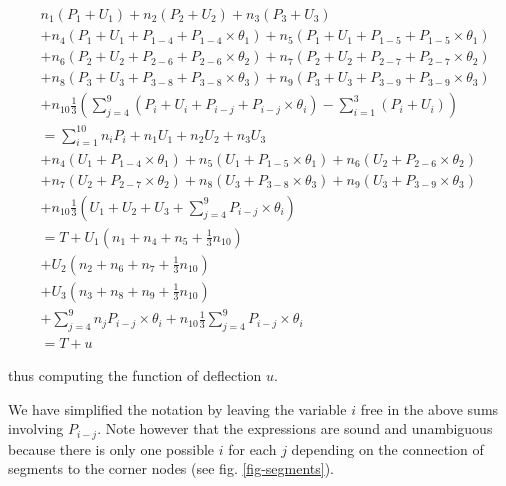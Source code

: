 \documentclass{egpubl}
\begin{document}
\begin{equation}
    \begin{split}
        & n_1 (P_1 + U_1)
        + n_2 (P_2 + U_2)
        + n_3 (P_3 + U_3) \\
        & + n_4 (P_1 + U_1 + P_{1-4} + P_{1-4} \times \theta_1)
        + n_5 (P_1 + U_1 + P_{1-5} + P_{1-5} \times \theta_1) \\
        & + n_6 (P_2 + U_2 + P_{2-6} + P_{2-6} \times \theta_2)
        + n_7(P_2 + U_2 + P_{2-7} + P_{2-7} \times \theta_2) \\
        & + n_8 (P_3 + U_3 + P_{3-8} + P_{3-8} \times \theta_3)
        + n_9 (P_3 + U_3 + P_{3-9} + P_{3-9} \times \theta_3) \\
        & + n_{10} \frac{1}{3} \left(
        \sum_{j=4}^9 (P_i + U_i + P_{i-j} + P_{i-j} \times \theta_i) - \sum_{i=1}^3 (P_i + U_i)
        \right) \\
%
        & = 
    \sum_{i=1}^{10} n_i P_i
      + n_1 U_1
      + n_2 U_2
      + n_3 U_3 \\
      & + n_4 (U_1 + P_{1-4} \times \theta_1)
      + n_5 (U_1 + P_{1-5} \times \theta_1)
      + n_6 (U_2 + P_{2-6} \times \theta_2) \\
      & + n_7 (U_2 + P_{2-7} \times \theta_2)
      + n_8 (U_3 + P_{3-8} \times \theta_3)
      + n_9 (U_3 + P_{3-9} \times \theta_3) \\
      & + n_{10} \frac{1}{3} (U_1 + U_2 + U_3 + \sum_{j=4}^9 P_{i-j} \times \theta_i) \\
%
      & = T + U_1 (n_1 + n_4 + n_5 + \frac{1}{3} n_{10}) \\
      & + U_2 (n_2 + n_6 + n_7 + \frac{1}{3} n_{10}) \\
      & + U_3 (n_3 + n_8 + n_9 + \frac{1}{3} n_{10}) \\
      & + \sum_{j=4}^9 n_j P_{i-j} \times \theta_i
      + n_{10} \frac{1}{3} \sum_{j=4}^9 P_{i-j} \times \theta_i \\
%
      & = T + u
  \end{split}
\end{equation}

\noindent
thus computing the function of deflection $u$.

We have simplified the notation by leaving the variable $i$ free in the above sums involving $P_{i-j}$.
Note however that the expressions are sound and unambiguous because there is only one possible $i$ for each $j$ depending on the connection of segments to the corner nodes (see fig. \ref{fig-segments}).
\end{document}
